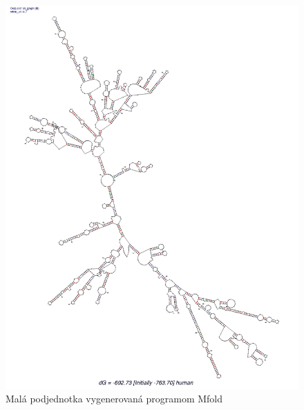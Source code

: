 \begin{figure}
  \includegraphics[trim=0 0 2cm 0, width=1\textwidth]{../img/human_mfold}
  \caption{Malá podjednotka vygenerovaná programom Mfold }
  \label{obr:RNA_human_mfold}
\end{figure}

